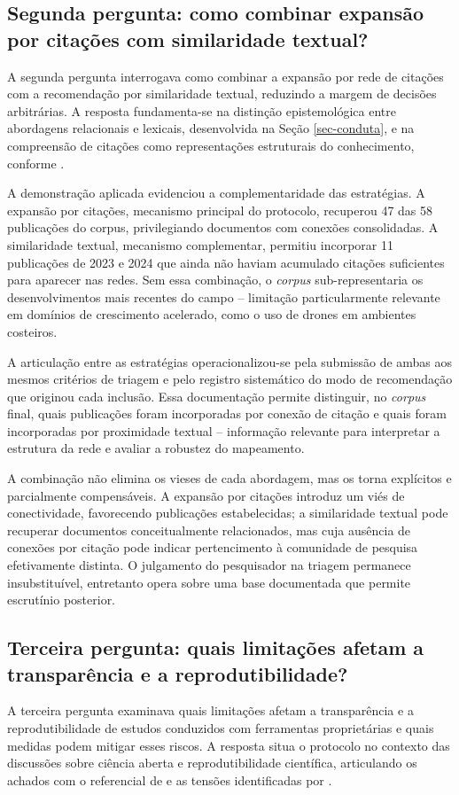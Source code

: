 \documentclass[portuguese]{textolivre}
\begin{document}
\subsection{Segunda pergunta: como combinar expansão por citações com similaridade textual?}\label{sec-links}
A segunda pergunta interrogava como combinar a expansão por rede de citações com a recomendação por similaridade textual, reduzindo a margem de decisões arbitrárias. A resposta fundamenta-se na distinção epistemológica entre abordagens relacionais e lexicais, desenvolvida na Seção \ref{sec-conduta}, e na compreensão de citações como representações estruturais do conhecimento, conforme \textcite{Zupic2015}.

	A demonstração aplicada evidenciou a complementaridade das estratégias. A expansão por citações, mecanismo principal do protocolo, recuperou 47 das 58 publicações do corpus, privilegiando documentos com conexões consolidadas. A similaridade textual, mecanismo complementar, permitiu incorporar 11 publicações de 2023 e 2024 que ainda não haviam acumulado citações suficientes para aparecer nas redes. Sem essa combinação, o \textit{corpus} sub-representaria os desenvolvimentos mais recentes do campo – limitação particularmente relevante em domínios de crescimento acelerado, como o uso de drones em ambientes costeiros.
    
	A articulação entre as estratégias operacionalizou-se pela submissão de ambas aos mesmos critérios de triagem e pelo registro sistemático do modo de recomendação que originou cada inclusão. Essa documentação permite distinguir, no \textit{corpus} final, quais publicações foram incorporadas por conexão de citação e quais foram incorporadas por proximidade textual – informação relevante para interpretar a estrutura da rede e avaliar a robustez do mapeamento.
    
	A combinação não elimina os vieses de cada abordagem, mas os torna explícitos e parcialmente compensáveis. A expansão por citações introduz um viés de conectividade, favorecendo publicações estabelecidas; a similaridade textual pode recuperar documentos conceitualmente relacionados, mas cuja ausência de conexões por citação pode indicar pertencimento à comunidade de pesquisa efetivamente distinta. O julgamento do pesquisador na triagem permanece insubstituível, entretanto opera sobre uma base documentada que permite escrutínio posterior.


\subsection{Terceira pergunta: quais limitações afetam a transparência e a reprodutibilidade?}\label{sec-listas}
A terceira pergunta examinava quais limitações afetam a transparência e a reprodutibilidade de estudos conduzidos com ferramentas proprietárias e quais medidas podem mitigar esses riscos. A resposta situa o protocolo no contexto das discussões sobre ciência aberta e reprodutibilidade científica, articulando os achados com o referencial de \textcite{Munafo2017} e as tensões identificadas por \textcite{Quintanilha2019}.
\end{document}
